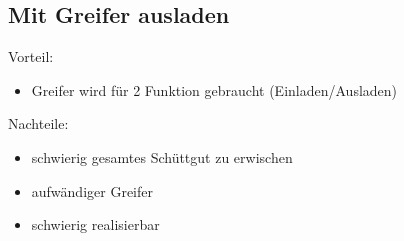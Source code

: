 \subsection{Mit Greifer ausladen}

Vorteil:
\begin{itemize}
\item Greifer wird für 2 Funktion gebraucht (Einladen/Ausladen)
\end{itemize}

\begin{flushleft}
Nachteile:
\end{flushleft}
\begin{itemize}
\item schwierig gesamtes Schüttgut zu erwischen
\item aufwändiger Greifer
\item schwierig realisierbar
\end{itemize}